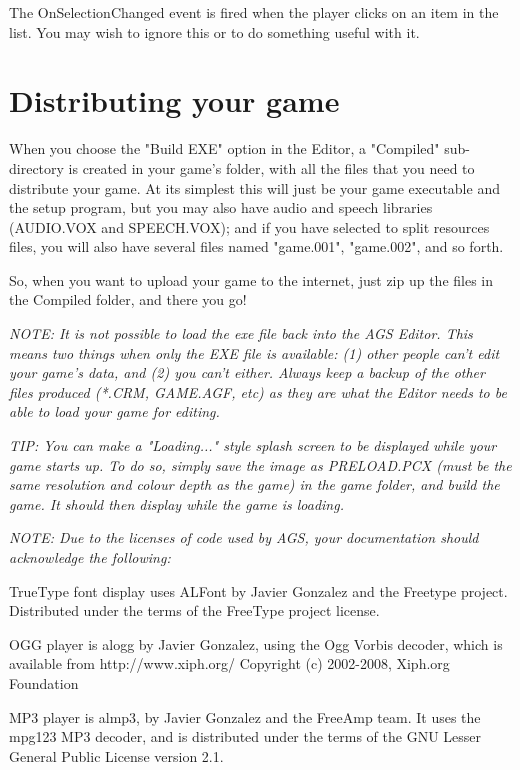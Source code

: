 The OnSelectionChanged event is fired when the player clicks on an item in the list.
You may wish to ignore this or to do something useful with it.

\section{Distributing your game}\label{DistGame}%

When you choose the "Build EXE" option in the Editor, a "Compiled" sub-directory
is created in your game's folder, with all the files that you need to distribute
your game. At its simplest this will just be your game executable and the setup
program, but you may also have audio and speech libraries (AUDIO.VOX and
SPEECH.VOX); and if you have selected to split resources files, you will also
have several files named "game.001", "game.002", and so forth.

So, when you want to upload your game to the internet, just zip up the files in
the Compiled folder, and there you go!

\it{NOTE: It is not possible to load the exe file back into the AGS Editor. This
means two things when only the EXE file is available: (1) other people can't
edit your game's data, and (2) you can't either. Always keep a backup of the
other files produced (*.CRM, GAME.AGF, etc) as they are what the Editor
needs to be able to load your game for editing.}

\it{TIP:} You can make a "Loading..." style splash screen to be displayed while your game starts
up. To do so, simply save the image as  PRELOAD.PCX (must be the same resolution and colour depth
as the game) in the game folder, and build the game. It should then display while the game is loading.

\it{NOTE: Due to the licenses of code used by AGS, your documentation should acknowledge the
following:}

TrueType font display uses ALFont by Javier Gonzalez and the Freetype project. Distributed
under the terms of the FreeType project license.

OGG player is alogg by Javier Gonzalez, using the Ogg Vorbis decoder, which is available
from http://www.xiph.org/  Copyright (c) 2002-2008, Xiph.org Foundation

MP3 player is almp3, by Javier Gonzalez and the FreeAmp team. It uses the mpg123 MP3 decoder,
and is distributed under the terms of the GNU Lesser General Public License version 2.1.

